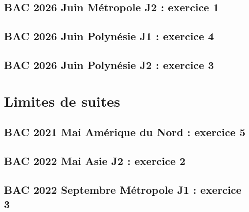 \documentclass[lang=fr,edition=teacher,layout=sheet]{mxbook}
\begin{document}
\begingroup\endgroup
\par\bigskip
{}\subsection*{BAC 2026 Juin Métropole J2 : exercice 1}
\begingroup\endgroup
\par\bigskip
{}\subsection*{BAC 2026 Juin Polynésie J1 : exercice 4}
\begingroup\endgroup
\par\bigskip
{}\subsection*{BAC 2026 Juin Polynésie J2 : exercice 3}
\begingroup\endgroup
\par\bigskip
\clearpage\section*{Limites de suites}
\subsection*{BAC 2021 Mai Amérique du Nord : exercice 5}
\begingroup\endgroup
\par\bigskip
{}\subsection*{BAC 2022 Mai Asie J2 : exercice 2}
\begingroup\endgroup
\par\bigskip
{}\subsection*{BAC 2022 Septembre Métropole J1 : exercice 3}
\end{document}
